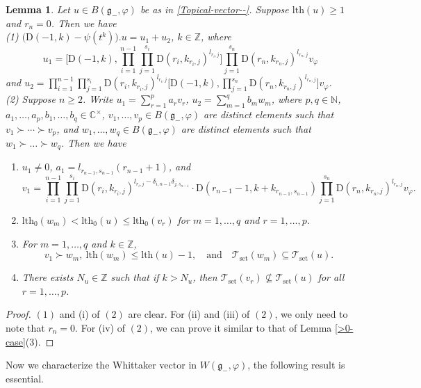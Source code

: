 \documentclass[12pt, a4paper]{amsart}
\newcommand{\fg}{\mathfrak g}
\newcommand{\C}{\mathbb{C}}
\newcommand{\N}{\mathbb N}
\newcommand{\Z}{\mathbb Z}
\newcommand{\rD}{\mathrm{D}}
\theoremstyle{Theorem}
\theoremstyle{Theorem}
\newtheorem{lemma}[thm]{Lemma}
\numberwithin{equation}{section}
\begin{document}
\begin{lemma}\label{=0-case}
Let $u\in B(\fg_{-},\varphi)$ be as in \eqref{Topical-vector--}.
Suppose $\mathrm{lth}(u)\geq1$ and $r_{n}=0$. Then we have\\
(1) $\big(\rD(-1,k)-\psi(t^{k})\big).u=u_{1}+u_{2}$, $k\in\Z$,
where \[u_{1}=\Big[\rD(-1,k),\prod_{i=1}^{n-1}\prod_{j=1}^{s_{i}}
\rD(r_{i},k_{r_{i},j})^{l_{r_{i},j}}\Big]\prod_{j=1}^{s_{n}}
\rD(r_{n},k_{r_{n},j})^{l_{r_{n},j}}v_{\varphi}\]
and
$u_{2}=\prod_{i=1}^{n-1}\prod_{j=1}^{s_{i}}
\rD(r_{i},k_{r_{i},j})^{l_{r_{i},j}}\Big[\rD(-1,k),\prod_{j=1}^{s_{n}}
\rD(r_{n},k_{r_{n},j})^{l_{r_{n},j}}\Big]v_{\varphi}$.\\
(2) Suppose $n\geq2$. Write $u_{1}=\sum_{r=1}^{p}a_{r}v_{r}$, $u_{2}=\sum_{m=1}^{q}b_{m}w_{m}$,
where $p,q\in\N$, $a_{1},\dots,a_{p},b_{1},\dots,b_{q}\in\C^{\times}$,
$v_{1},\dots,v_{p}\in B(\fg_{-},\varphi)$ are distinct elements such that $v_{1}\succ\cdots\succ v_{p}$,
and $w_{1},\dots,w_{q}\in B(\fg_{-},\varphi)$ are distinct elements
such that $w_{1}\succ\dots\succ w_{q}$. Then we have
\begin{enumerate}
\item[(i)] $u_{1}\neq0$, $a_{1}=l_{r_{n-1},s_{n-1}}(r_{n-1}+1)$, and
\[v_{1}=\prod_{i=1}^{n-1}\prod_{j=1}^{s_{i}}
\rD(r_{i},k_{r_{i},j})^{l_{r_{i},j}-\delta_{i,n-1}\delta_{j,s_{n-1}}}
\cdot \rD(r_{n-1}-1,k+k_{r_{n-1},s_{n-1}})\prod_{j=1}^{s_{n}}
\rD(r_{n},k_{r_{n},j})^{l_{r_{n},j}}v_{\varphi}.\]
\item[(ii)] $\mathrm{lth}_{0}(w_{m})<\mathrm{lth}_{0}(u)\leq\mathrm{lth}_{0}(v_{r})$ for
$m=1,\dots,q$ and $r=1,\dots,p$.
\item[(iii)] For $m=1,\dots,q$ and $k\in\Z$,
\[v_{1}\succ w_{m},\ \mathrm{lth}(w_{m})\leq \mathrm{lth}(u)-1,\quad\text{and}\quad
\mathcal{T}_{\mathrm{set}}(w_{m})\subseteq\mathcal{T}_{\mathrm{set}}(u).\]
\item[(iv)] There exists $N_{u}\in\Z$ such that if $k>N_{u}$, then
$\mathcal{T}_{\mathrm{set}}(v_{r})\nsubseteq\mathcal{T}_{\mathrm{set}}(u)$ for all $r=1,\dots,p$.
\end{enumerate}

\end{lemma}
\begin{proof}
$(1)$ and (i) of $(2)$ are clear. For (ii) and (iii) of $(2)$,
we only need to note that $r_{n}=0$. For (iv) of $(2)$, we can
prove it similar to that of Lemma \ref{>0-case}(3).
\end{proof}


Now we characterize the Whittaker vector in $W(\fg_{-},\varphi)$, the following result is essential.
\end{document}
